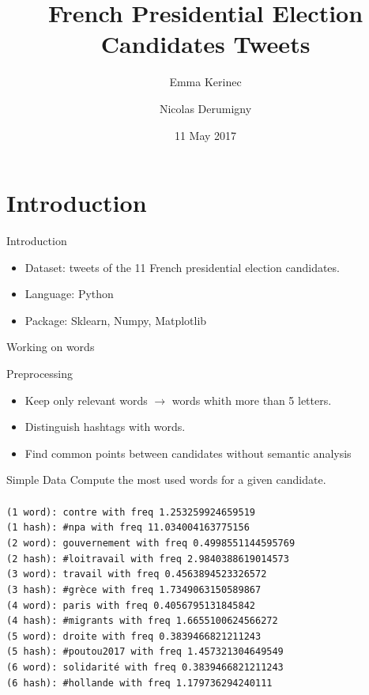 \documentclass{beamer}
\title[DM-Project 2]{French Presidential Election Candidates Tweets}
\author[E. Kerinec and N. Derumigny]{Emma Kerinec \and Nicolas Derumigny}
\institute[]{ENS Lyon}
\date{11 May 2017}
\begin{document}
\begin{frame}
	\titlepage
	\begin{center}
	\end{center}
\end{frame}



\section{Introduction}
\begin{frame}{Introduction}
\begin{itemize}
\item Dataset: tweets of the 11 French presidential election candidates.
\item Language: Python
\item Package: Sklearn, Numpy, Matplotlib
\end{itemize}

\end{frame}

\begin{frame}{Working on words}
\begin{block}{Preprocessing}
\begin{itemize}
\item Keep only relevant words $\to$ words whith more than 5 letters.
\item Distinguish hashtags with words.
\item Find common points between candidates without semantic analysis
\end{itemize}
\end{block}
\end{frame}

\begin{frame}{Simple Data}
Compute the most used words for a given candidate.\\

\begingroup
\fontsize{8pt}{12pt}
\texttt{\\
(1 word): contre with freq 1.253259924659519\\
(1 hash): \#npa with freq 11.034004163775156\\
(2 word): gouvernement with freq 0.4998551144595769\\
(2 hash): \#loitravail with freq 2.9840388619014573\\
(3 word): travail with freq 0.4563894523326572\\
(3 hash): \#grèce with freq 1.7349063150589867\\
(4 word): paris with freq 0.4056795131845842\\
(4 hash): \#migrants with freq 1.6655100624566272\\
(5 word): droite with freq 0.3839466821211243\\
(5 hash): \#poutou2017 with freq 1.457321304649549\\
(6 word): solidarité with freq 0.3839466821211243\\
(6 hash): \#hollande with freq 1.179736294240111\\
}
\endgroup
\end{frame}
\end{document}
